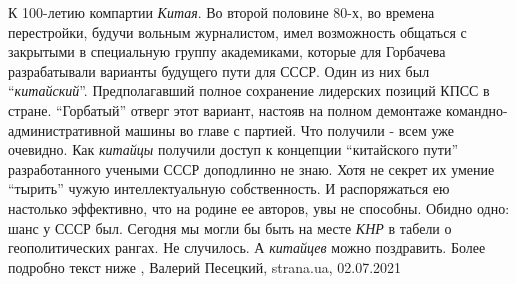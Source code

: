 К 100-летию компартии \emph{Китая}.  Во второй половине 80-х, во времена перестройки,
будучи вольным журналистом, имел возможность общаться с закрытыми в специальную
группу академиками, которые для Горбачева разрабатывали варианты будущего пути
для СССР. Один из них был \enquote{\emph{китайский}}. Предполагавший полное сохранение
лидерских позиций КПСС в стране.  \enquote{Горбатый} отверг этот вариант, настояв на
полном демонтаже командно-административной машины во главе с партией. Что
получили - всем уже очевидно.  Как \emph{китайцы} получили доступ к концепции
\enquote{китайского пути} разработанного учеными СССР доподлинно не знаю. Хотя не
секрет их умение \enquote{тырить} чужую интеллектуальную собственность. И распоряжаться
ею настолько эффективно, что на родине ее авторов, увы не способны. Обидно
одно: шанс у СССР был. Сегодня мы могли бы быть на месте \emph{КНР} в табели о
геополитических рангах.  Не случилось. А \emph{китайцев} можно поздравить. Более
подробно текст ниже
, 
Валерий Песецкий, strana.ua, 02.07.2021
